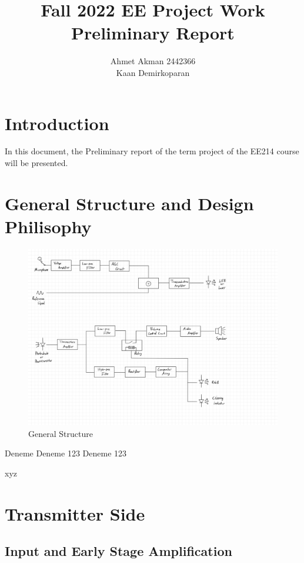 \documentclass[a4paper,10pt]{IEEEtran}
\begin{document}

\title{  Fall 2022 EE Project Work  \protect\\ Preliminary Report}
\author{ Ahmet Akman 2442366 \protect\\ Kaan Demirkoparan}
\date{}
\maketitle
\section{Introduction}
In this document, the Preliminary report of the term project of the EE214 course will be presented. 
\section{General Structure and Design Philisophy}
\begin{figure}[h]
    \centering
    \includegraphics[width = 1\linewidth]{general_structure.jpeg}
    \caption{General Structure}
\end{figure} 
Deneme
Deneme 123 Deneme 123

xyz

\section{Transmitter Side}
\subsection{Input and Early Stage Amplification}
\end{document}
